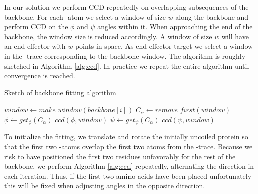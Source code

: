 In our solution we perform CCD repeatedly on overlapping subsequences of the backbone.
For each \Ca-atom we select a window of size $w$ along the backbone and perform CCD on the $\phi$ and $\psi$ angles within it.
When approaching the end of the backbone, the window size is reduced accordingly.
A window of size $w$ will have an end-effector with $w$ points in space.
As end-effector target we select a window in the \Ca-trace corresponding to the backbone window. 
The algorithm is roughly sketched in Algorithm \ref{alg:ccd}.
In practice we repeat the entire algorithm until convergence is reached.

\begin{algorithm}
\caption{Sketch of backbone fitting algorithm}
\label{alg:ccd}
\begin{algorithmic}
			\STATE $window \gets make\_window(backbone[i])$
				\STATE $C_\alpha \gets remove\_first(window)$
				\STATE $\phi \gets get_\phi(C_\alpha)$
				\STATE $ccd(\phi,window)$
				\STATE $\psi \gets get_\psi(C_\alpha)$
				\STATE $ccd(\psi,window)$
			\ENDWHILE
		\ENDFOR
	\ENDFOR
\end{algorithmic}
\end{algorithm}



To initialize the fitting, we translate and rotate the initially uncoiled protein so that the first two \Ca-atoms overlap the first two atoms from the \Ca-trace.
Because we risk to have positioned the first two residues unfavorably for the rest of the backbone, we perform Algorithm \ref{alg:ccd} repeatedly, alternating the direction in each iteration.
Thus, if the first two amino acids have been placed unfortunately this will be fixed when adjusting angles in the opposite direction.




